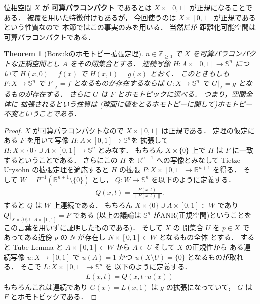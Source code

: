 \documentclass[leqno, a4paper, 12pt]{jsarticle}
\theoremstyle{plain}
\newtheorem{thm}{Theorem}[section]
\theoremstyle{definition}
\theoremstyle{remark}
\newcommand{\zz}{\mathbb{Z}}
\newcommand{\rr}{\mathbb{R}}
\newcommand{\yoemph}[1]{\textbf{#1}}
\newcommand{\yospfont}[1]{\mathbb{#1}}
\newcommand{\yosphere}[1]{\yospfont{S}^{#1}}
\numberwithin{equation}{section}
\begin{document}
位相空間
$X$
が
\yoemph{可算パラコンパクト}
であるとは
$X\times [0, 1]$
が正規になることである．
被覆を用いた特徴付けもあるが，
今回使うのは
$X\times [0, 1]$
が正規であるという性質なので
本節ではこの事実のみを用いる．
当然だが
距離化可能空間は
可算パラコンパクトである．
\begin{thm}[Borsukのホモトピー拡張定理]\label{thm:borsukhomotopy}
$n\in \zz_{\ge 0}$
で
$X$
を可算パラコンパクトな正規空間とし
$A$
をその閉集合とする．
連続写像
$H\colon A\times [0, 1]\to \yosphere{n}$
について
$H(x, 0)=f(x)$
で
$H(x, 1)=g(x)$
とおく．
このときもしも
$F\colon X\to \yosphere{n}$
で
$F|_{A}=f$
となるものが存在するならば
$G\colon X\to \yosphere{n}$
で
$G|_{A}=g$
となるものが存在する．
さらに
$G$
は
$F$
とホモトピックに選べる．
つまり，空間全体に
拡張されるという性質は
(球面に値をとるホモトピーに関して)ホモトピー
不変ということである．
\end{thm}
\begin{proof}
$X$
が可算パラコンパクトなので
$X\times [0, 1]$
は正規である．
定理の仮定にある
$F$
を用いて写像
$H\colon A\times [0, 1]\to \yosphere{n}$を
拡張して
$H\colon X\times \{0\}\cup  A\times [0, 1]\to\yosphere{n} $
とみなす．
もちろん
$X\times \{0\}$
上で
$H$
は
$F$
に一致するということである．
さらにこの
$H$
を
$\rr^{n+1}$
への写像とみなして
Tietze-Urysohn
の拡張定理を適応すると
$H$
の拡張
$P\colon X\times [0, 1]\to \rr^{n+1}$
を得る．
そして
$W=P^{-1}(\rr^{n+1}\setminus \{0\})$
とし，
$Q\colon W\to \yosphere{n}$
を以下のように定義する．
\begin{align}
Q(x, t)=\frac{P(x, t)}{\lVert P(x, t)\rVert}. 
\end{align}
すると
$Q$
は
$W$
上連続である．
もちろん
$X\times \{0\}\cup  A\times [0, 1]\subset W$
であり
$Q|_{X\times \{0\}\cup A\times [0, 1]}=P$
である
(以上の議論は
$\yosphere{n}$
がANR(正規空間)ということをこの言葉を用いずに証明したものである)．
そして
$X$
の
開集合
$U$
を
$p\in X$
であってある近傍
$p$
の
$N$
が存在し
$N\times [0, 1]\subset W$
となるもの全体
とする．
すると
Tube Lemma 
と
$A\times [0, 1]\subset W$
から
$A\subset U$
そして
$X$
の正規性から
ある連続写像
$u\colon X\to [0, 1]$
で
$u(A)=1$
かつ
$u(X\setminus U)=\{0\}$
となるものが取れる．
そこで
$L\colon X\times [0, 1]\to \yosphere{n}$
を
以下のように定義する．
\begin{align}
L(x, t)=
Q(x,  t\cdot u(x))
\end{align}
もちろんこれは連続であり
$G(x)=L(x, 1)$
は
$g$
の拡張になっていて，
$G$
は
$F$
とホモトピックである．
\end{proof}
\end{document}
